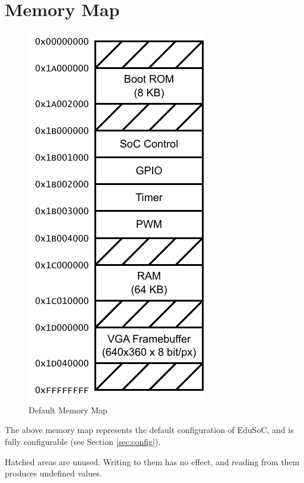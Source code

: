 \section{Memory Map}\label{sec:memorymap}
\begin{figure}[H]
    \centering
    \includegraphics[height=.6\paperheight]{graphics/EduSoC Memory Map.pdf}
    \caption{Default Memory Map}
    \label{fig:memory_map}
\end{figure}
The above memory map represents the default configuration of EduSoC, and is fully configurable (see Section \ref{sec:config}).

Hatched areas are unused. Writing to them has no effect, and reading from them produces undefined values.